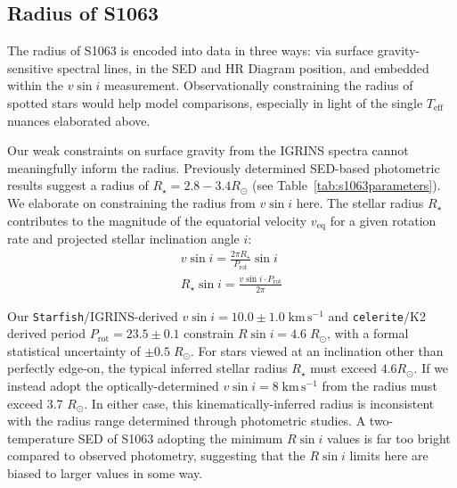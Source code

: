 \documentclass[trackchanges]{aastex631}
\begin{document}
\subsection{Radius of S1063}
\label{sec:radius}

The radius of S1063 is encoded into data in three ways: via surface gravity-sensitive spectral lines, in the SED and HR Diagram position, and embedded within the $v\sin{i}$ measurement. Observationally constraining the radius of spotted stars would help model comparisons, especially in light of the single $T_{\textrm{eff}}$ nuances elaborated above.

Our weak constraints on surface gravity from the IGRINS spectra cannot meaningfully inform the radius. Previously determined SED-based photometric results suggest a radius of $R_{\star} = 2.8-3.4 R_\odot$ (see Table~\ref{tab:s1063parameters}). We elaborate on constraining the radius from $v\sin{i}$ here.
The stellar radius $R_{\star}$ contributes to the magnitude of the equatorial velocity $v_{\mathrm{eq}}$ for a given rotation rate and projected stellar inclination angle $i$:
\begin{eqnarray}
  v \sin{i} = \frac{2\pi R_{\star}}{P_{\mathrm{rot}}} \sin{i} \\
  R_{\star} \sin{i} = \frac{v \sin{i} \cdot P_{\mathrm{rot}}}{2 \pi} \label{rsini}
\end{eqnarray}

Our \texttt{Starfish}/IGRINS-derived $v\sin{i}=10.0 \pm 1.0 \; \mathrm{km\,s^{-1}}$ and \texttt{celerite}/K2 derived period $P_{\mathrm{rot}}=23.5 \pm 0.1$ constrain $R\sin{i} = 4.6 \;R_\odot$, with a formal statistical uncertainty of $\pm 0.5 \;R_\odot$.  For stars viewed at an inclination other than perfectly edge-on, the typical inferred stellar radius $R_{\star}$ must exceed $4.6 R_{\odot}$. If we instead adopt the optically-determined $v\sin{i}=8\; \mathrm{km\,s^{-1}}$ from \citet{mathieu03} the radius must exceed 3.7 $R_{\odot}$. In either case, this kinematically-inferred radius is inconsistent with the radius range determined through photometric studies. A two-temperature SED of S1063 adopting the minimum $R\sin{i}$ values is far too bright compared to observed photometry, suggesting that the $R\sin{i}$ limits here are biased to larger values in some way.
\end{document}
